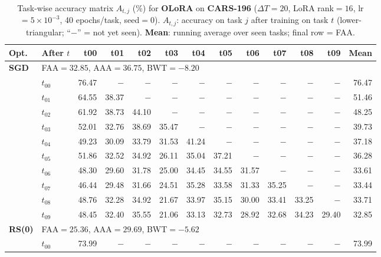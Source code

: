 \begin{table}[ht]
\centering
\caption{%
  Task-wise accuracy matrix $A_{t,j}$ (\%) for \textbf{OLoRA} on \textbf{CARS-196} ($\Delta T=20$, LoRA rank$=16$, lr$=5\times10^{-3}$, 40 epochs/task, seed$=0$).
  $A_{t,j}$: accuracy on task $j$ after training on task $t$  (lower-triangular; ``$-$'' = not yet seen).
  \textbf{Mean}: running average over seen tasks; final row = FAA.
}
\label{tab:raw_olora_cars196}
\setlength{\tabcolsep}{2.8pt}
\renewcommand{\arraystretch}{0.88}
\scriptsize
\begin{tabular}{@{}l l r r r r r r r r r r r@{}}
\toprule
\textbf{Opt.} & \textbf{After $t$} & \textbf{t00} & \textbf{t01} & \textbf{t02} & \textbf{t03} & \textbf{t04} & \textbf{t05} & \textbf{t06} & \textbf{t07} & \textbf{t08} & \textbf{t09} & \textbf{Mean} \\
\midrule
\multirow{11}{*}{\textbf{SGD}} & \multicolumn{12}{l}{\quad\small FAA$=32.85$,\; AAA$=36.75$,\; BWT$=-8.20$} \\
 & $t_{00}$ & 76.47 & $-$ & $-$ & $-$ & $-$ & $-$ & $-$ & $-$ & $-$ & $-$ & 76.47 \\
 & $t_{01}$ & 64.55 & 38.37 & $-$ & $-$ & $-$ & $-$ & $-$ & $-$ & $-$ & $-$ & 51.46 \\
 & $t_{02}$ & 61.92 & 38.73 & 44.10 & $-$ & $-$ & $-$ & $-$ & $-$ & $-$ & $-$ & 48.25 \\
 & $t_{03}$ & 52.01 & 32.76 & 38.69 & 35.47 & $-$ & $-$ & $-$ & $-$ & $-$ & $-$ & 39.73 \\
 & $t_{04}$ & 49.23 & 30.09 & 33.79 & 31.53 & 41.24 & $-$ & $-$ & $-$ & $-$ & $-$ & 37.18 \\
 & $t_{05}$ & 51.86 & 32.52 & 34.92 & 26.11 & 35.04 & 37.21 & $-$ & $-$ & $-$ & $-$ & 36.28 \\
 & $t_{06}$ & 48.30 & 29.60 & 31.78 & 25.00 & 34.45 & 34.55 & 31.57 & $-$ & $-$ & $-$ & 33.61 \\
 & $t_{07}$ & 46.44 & 29.48 & 31.66 & 24.51 & 35.28 & 33.58 & 31.33 & 35.25 & $-$ & $-$ & 33.44 \\
 & $t_{08}$ & 48.76 & 32.28 & 34.92 & 21.67 & 33.97 & 35.15 & 30.00 & 33.41 & 33.25 & $-$ & 33.71 \\
 & $t_{09}$ & 48.45 & 32.40 & 35.55 & 21.06 & 33.13 & 32.73 & 28.92 & 32.68 & 34.23 & 29.40 & 32.85 \\
\midrule
\multirow{11}{*}{\textbf{RS(0)}} & \multicolumn{12}{l}{\quad\small FAA$=25.36$,\; AAA$=29.69$,\; BWT$=-5.62$} \\
 & $t_{00}$ & 73.99 & $-$ & $-$ & $-$ & $-$ & $-$ & $-$ & $-$ & $-$ & $-$ & 73.99 \\

\end{tabular}
\end{table}
